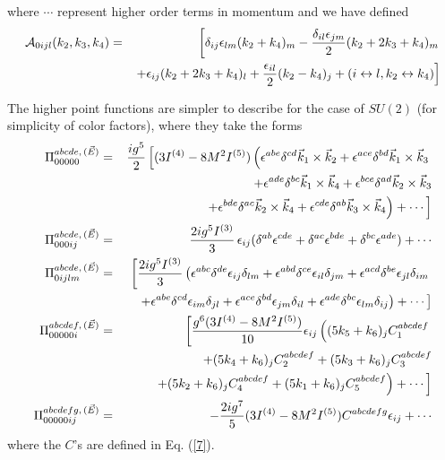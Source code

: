 \documentclass[a4paper,12pt]{article}
\begin{document}
where $\cdots$ represent higher order terms in momentum and we have
defined 
\begin{eqnarray}
{\cal A}_{0ijl} (k_{2},k_{3},k_{4}) & = &
\left[\delta_{ij}\epsilon_{lm}(k_{2}+k_{4})_{m} -
  {\delta_{il}\epsilon_{jm}\over 2}
  (k_{2}+2k_{3}+k_{4})_{m}\right.\nonumber \\
 &  & \left.+ \epsilon_{ij} (k_{2}+2k_{3}+k_{4})_{l} +
   {\epsilon_{il}\over 2} (k_{2}-k_{4})_{j} + 
(i\leftrightarrow l, k_{2}\leftrightarrow k_{4})\right]\nonumber
\end{eqnarray}

The higher point functions are simpler to describe for the case of
$SU(2)$ (for simplicity of color factors), where they take the forms
\begin{eqnarray}
\Pi_{00000}^{abcde,\,(\vec{E})} & = &  {ig^{5}\over 2}\left[(3I^{(4)} -
8M^{2}I^{(5)}) \left(\epsilon^{abe}\delta^{cd} \vec{k}_{1}\times
  \vec{k}_{2} + \epsilon^{ace}\delta^{bd} \vec{k}_{1}\times
  \vec{k}_{3} \right.\right.\nonumber\\
 &  & \quad + \epsilon^{ade}\delta^{bc} \vec{k}_{1}\times
  \vec{k}_{4} + \epsilon^{bce}\delta^{ad} \vec{k}_{2}\times
   \vec{k}_{3}\nonumber\\
 &  & \quad \left.\left. + \epsilon^{bde}\delta^{ac} \vec{k}_{2}\times
   \vec{k}_{4} + \epsilon^{cde}\delta^{ab} \vec{k}_{3}\times
   \vec{k}_{4}\right) + \cdots \right]\nonumber\\
\Pi_{000ij}^{abcde,\,(\vec{E})} & = & {2ig^{5}I^{(3)}\over 3} \,\epsilon_{ij}
(\delta^{ab}\epsilon^{cde} + \delta^{ac}\epsilon^{bde} +
\delta^{bc}\epsilon^{ade}) + \cdots\nonumber\\
\Pi_{0ijlm}^{abcde,\,(\vec{E})} & = &\left[{2ig^{5}I^{(3)}\over
    3}\left(\epsilon^{abc}\delta^{de}\epsilon_{ij}\delta_{lm} +
    \epsilon^{abd}\delta^{ce}\epsilon_{il}\delta_{jm} +
    \epsilon^{acd}\delta^{be}\epsilon_{jl}\delta_{im}\right.\right.\nonumber\\
 &  & \quad \left.\left. +
     \epsilon^{abe}\delta^{cd}\epsilon_{im}\delta_{jl} +
     \epsilon^{ace}\delta^{bd}\epsilon_{jm}\delta_{il} +
     \epsilon^{ade}\delta^{bc}\epsilon_{lm}\delta_{ij}\right) + \cdots
 \right]\nonumber\\
\Pi_{00000i}^{abcdef,\,(\vec{E})} & = &
\left[{g^{6}(3I^{(4)}-8M^{2}I^{(5)})\over
    10}\epsilon_{ij}\left((5k_{5}+k_{6})_{j}
    C_{1}^{abcdef}\right.\right.\nonumber\\
 &  & \quad +
    (5k_{4}+k_{6})_{j} C_{2}^{abcdef} + (5k_{3}+k_{6})_{j}
    C_{3}^{abcdef}\nonumber\\
 &  & \quad \left.\left. +
     (5k_{2}+k_{6})_{j} C_{4}^{abcdef} + (5k_{1}+k_{6})_{j}
     C_{5}^{abcdef}\right) + \cdots \right]\nonumber\\
\Pi_{00000ij}^{abcdefg,\,(\vec{E})} & = & -{2ig^{7}\over 5} (3I^{(4)}-
8M^{2}I^{(5)}) C^{abcdefg}\epsilon_{ij} + \cdots\label{24}
\end{eqnarray}
where the $C$'s are defined in Eq. (\ref{7}).
\end{document}
